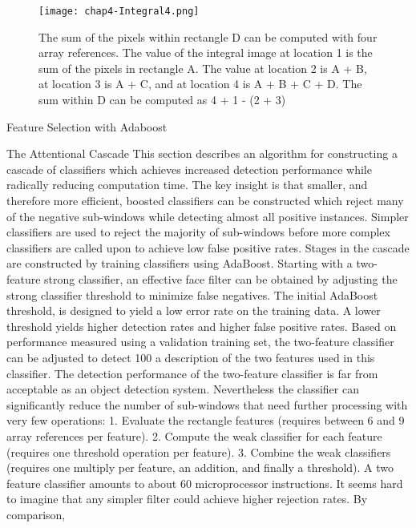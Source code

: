\begin{compactitem}
\begin{figure}[h]
  \centering
	\texttt{[image: chap4-Integral4.png]}
  \caption{The sum of the pixels within rectangle D can be computed with four array
references. The value of the integral image at location 1 is the sum of the pixels in
rectangle A. The value at location 2 is A + B, at location 3 is A + C, and at location
4 is A + B + C + D. The sum within D can be computed as 4 + 1 - (2 + 3)}
  \label{fig:chap4-Integral4}
\end{figure}


\item {Feature Selection with Adaboost}
\item {The Attentional Cascade}
This section describes an algorithm for constructing a cascade of classifiers which
achieves increased detection performance while radically reducing computation time.
The key insight is that smaller, and therefore more efficient, boosted classifiers can be
constructed which reject many of the negative sub-windows while detecting almost all
positive instances. Simpler classifiers are used to reject the majority of sub-windows
before more complex classifiers are called upon to achieve low false positive rates.
Stages in the cascade are constructed by training classifiers using AdaBoost. Starting
with a two-feature strong classifier, an effective face filter can be obtained by adjusting
the strong classifier threshold to minimize false negatives. The initial AdaBoost
threshold,
is designed to yield a low error rate on the training data. A lower
threshold yields higher detection rates and higher false positive rates. Based on performance
measured using a validation training set, the two-feature classifier can be
adjusted to detect 100%
a description of the two features used in this classifier.
The detection performance of the two-feature classifier is far from acceptable as an
object detection system. Nevertheless the classifier can significantly reduce the number
of sub-windows that need further processing with very few operations:
1. Evaluate the rectangle features (requires between 6 and 9 array references per
feature).
2. Compute the weak classifier for each feature (requires one threshold operation
per feature).
3. Combine the weak classifiers (requires one multiply per feature, an addition, and
finally a threshold).
A two feature classifier amounts to about 60 microprocessor instructions. It seems
hard to imagine that any simpler filter could achieve higher rejection rates. By comparison,

\end{compactitem}
